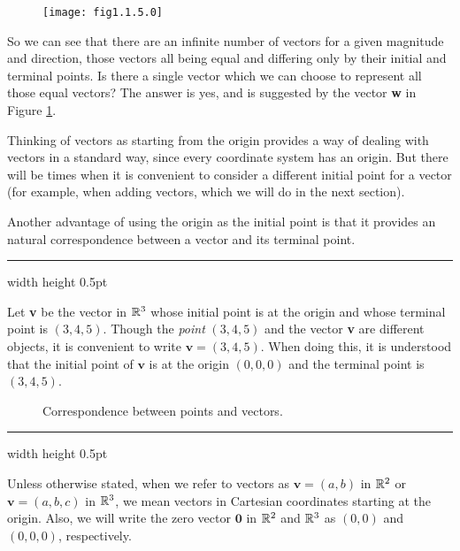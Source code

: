 \begin{figure}[h]
 \begin{center}
  \texttt{[image: fig1.1.5.0]}
 \end{center}
 \caption[]{}
 \label{fig:veceq}
\end{figure}

So we can see that there are an infinite number of vectors for a given magnitude and direction, those vectors all
being equal and differing only by their initial and terminal points.  Is there a single vector which we can choose to
represent all those equal vectors?  The answer is yes, and is suggested by the vector \textbf{w} in Figure
\ref{fig:veceq}.


\medskip
Thinking of vectors as starting from the origin provides a way of dealing with vectors in a standard way, since every
coordinate system has an origin.  But there
will be times when it is convenient to consider a different initial point for a vector (for example, when adding
vectors, which we will do in the next section).

Another advantage of using the origin as the initial point is that it provides an natural correspondence between a
vector and its terminal point.

\medskip
\hrule width \textwidth height 0.5pt
\begin{exmp}
 Let \textbf{v} be the vector in $\mathbb{R}^{3}$ whose initial point is at the origin and whose terminal point
 is $(3,4,5)$.  Though the \emph{point} $(3,4,5)$ and the vector \textbf{v} are different objects, it is
 convenient to write $\textbf{v} = (3,4,5)$.  When doing this, it is understood that the initial point of $\textbf{v}$
 is at the origin $(0,0,0)$ and the terminal point is $(3,4,5)$.
\end{exmp}

\begin{figure}[h]
 \centering
 \qquad\qquad
 \caption[]{\quad Correspondence between points and vectors.}
 \label{fig:corresp}
\end{figure}
\hrule width \textwidth height 0.5pt
\medskip

Unless otherwise stated, when we refer to vectors as $\textbf{v} = (a,b)$ in $\mathbb{R}^{2}$ or $\textbf{v} = (a,b,c)$
in $\mathbb{R}^{3}$, we mean vectors in Cartesian coordinates starting at the origin.  Also, we will write
the zero vector $\textbf{0}$ in $\mathbb{R}^{2}$ and $\mathbb{R}^{3}$ as $(0,0)$ and $(0,0,0)$, respectively.

